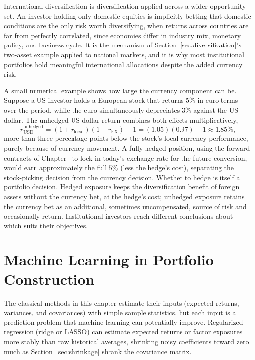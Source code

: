 \documentclass[../ai_in_finance]{subfiles}
\begin{document}
International diversification is diversification applied across a wider opportunity set. An investor holding only domestic equities is implicitly betting that domestic conditions are the only risk worth diversifying, when returns across countries are far from perfectly correlated, since economies differ in industry mix, monetary policy, and business cycle.
It is the mechanism of Section~\ref{sec:diversification}'s two-asset example applied to national markets, and it is why most institutional portfolios hold meaningful international allocations despite the added currency risk.

A small numerical example shows how large the currency component can be. Suppose a US investor holds a European stock that returns $5\%$ in euro terms over the period, while the euro simultaneously depreciates $3\%$ against the US dollar. The unhedged US-dollar return combines both effects multiplicatively,
\begin{equation*}
r_{\text{USD}}^{\text{unhedged}} = (1 + r_{\text{local}})(1 + r_{\text{FX}}) - 1 = (1.05)(0.97) - 1 \approx 1.85\%,
\end{equation*}
more than three percentage points below the stock's local-currency performance, purely because of currency movement. A fully hedged position, using the forward contracts of Chapter~ to lock in today's exchange rate for the future conversion, would earn approximately the full $5\%$ (less the hedge's cost), separating the stock-picking decision from the currency decision.
Whether to hedge is itself a portfolio decision. Hedged exposure keeps the diversification benefit of foreign assets without the currency bet, at the hedge's cost; unhedged exposure retains the currency bet as an additional, sometimes uncompensated, source of risk and occasionally return. Institutional investors reach different conclusions about which suits their objectives.

\section{Machine Learning in Portfolio Construction}
\label{sec:ml-portfolio}

The classical methods in this chapter estimate their inputs (expected returns, variances, and covariances) with simple sample statistics, but each input is a prediction problem that machine learning can potentially improve. Regularized regression (ridge or LASSO) can estimate expected returns or factor exposures more stably than raw historical averages, shrinking noisy coefficients toward zero much as Section~\ref{sec:shrinkage} shrank the covariance matrix.
\end{document}
